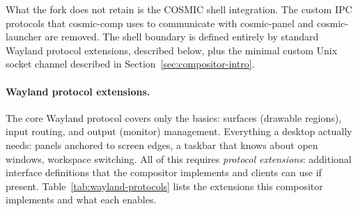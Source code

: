 What the fork does not retain is the COSMIC shell integration. The custom
IPC protocols that cosmic-comp uses to communicate with cosmic-panel and
cosmic-launcher are removed. The shell boundary is defined entirely by
standard Wayland protocol extensions, described below, plus the minimal
custom Unix socket channel described in Section~\ref{sec:compositor-intro}.

\paragraph{Wayland protocol extensions.}
The core Wayland protocol covers only the basics: surfaces (drawable regions),
input routing, and output (monitor) management. Everything a desktop actually
needs: panels anchored to screen edges, a taskbar that knows about open
windows, workspace switching. All of this requires \emph{protocol extensions}: additional
interface definitions that the compositor implements and clients can use if
present. Table~\ref{tab:wayland-protocols} lists the extensions this compositor
implements and what each enables.

